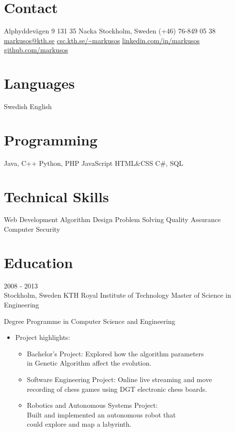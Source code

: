 \documentclass{markusos-cv}
\begin{document}


\begin{aside}
\section{Contact}
Alphyddevägen 9
131 35 Nacka
Stockholm, Sweden
(+46) 76-849 05 38
~
\href{mailto:markusos@kth.se}{markusos@kth.se}
\href{http://www.csc.kth.se/~markusos}{csc.kth.se/\textasciitilde markusos}
\href{http://www.linkedin.com/in/markusos}{linkedin.com/in/markusos}
\href{https://github.com/markusos}{github.com/markusos}
\section{Languages}
Swedish
English
\section{Programming}
Java, C++
Python, PHP
JavaScript
HTML\&CSS
C\#, SQL
\section{Technical Skills}
Web Development
Algorithm Design
Problem Solving
Quality Assurance
Computer Security
\end{aside}


\section{Education}

\begin{entrylist}
\entry
{2008 - 2013 \\}
{Stockholm, Sweden}
{KTH Royal Institute of Technology}
{Master of Science in Engineering}
{
Degree Programme in Computer Science and Engineering
\begin{itemize}
	\item Project highlights: 
	\begin{itemize}
		\item Bachelor’s Project: Explored how the algorithm parameters\\ in Genetic Algorithm affect the evolution.
		\item Software Engineering Project: Online live streaming and move\\ recording of chess games using DGT electronic chess boards. 
		\item Robotics and Autonomous Systems Project:\\ Built and implemented an autonomous robot that\\ could explore and map a labyrinth.
	\end{itemize}
\end{itemize}
}
\end{entrylist}
\end{document}
